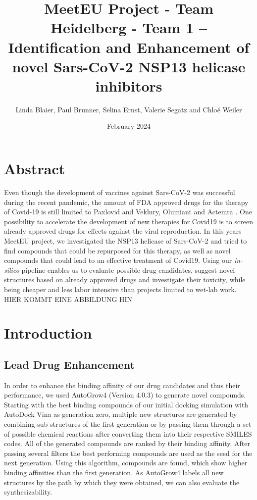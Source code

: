 \documentclass[11pt, letterpaper, titlepage]{article}
\title{MeetEU Project - Team Heidelberg - Team 1 -- \\ Identification and Enhancement of novel Sars-CoV-2 NSP13 helicase inhibitors}
\author{Linda Blaier, Paul Brunner, Selina Ernst, Valerie Segatz and Chlo\'{e} Weiler}
\date{February 2024}
\begin{document}
\maketitle

\ihead{\headmark}
\cfoot{\pagemark}   %

\section{Abstract}
Even though the development of vaccines against Sars-CoV-2 was successful during the recent pandemic, the amount of FDA approved drugs for the therapy of Covid-19 is still limited to Paxlovid and Veklury, Olumiant and Actemra \cite{FDA_COVID}. One possibility to accelerate the development of new therapies for Covid19 is to screen already approved drugs for effects against the viral reproduction. In this years MeetEU project, we investigated the NSP13 helicase of Sars-CoV-2 and tried to find compounds that could be repurposed for this therapy, as well as novel compounds that could lead to an effective treatment of Covid19. Using our \textit{in-silico} pipeline enables us to evaluate possible drug candidates, suggest novel structures based on already approved drugs and investigate their toxicity, while being cheaper and less labor intensive than projects limited to wet-lab work. 
HIER KOMMT EINE ABBILDUNG HIN

\FloatBarrier


\section{Introduction}
\subsection{Lead Drug Enhancement}
In order to enhance the binding affinity of our drug candidates and thus their performance, we used AutoGrow4 (Version 4.0.3) \cite{package_Autogrow4} to generate novel compounds. Starting with the best binding compounds of our initial docking simulation with AutoDock Vina as generation zero, multiple new structures are generated by combining sub-structures of the first generation or by passing them through a set of possible chemical reactions after converting them into their respective SMILES codes. All of the generated compounds are ranked by their binding affinity. After passing several filters the best performing compounds are used as the seed for the next generation. Using this algorithm, compounds are found, which show higher binding affinities than the first generation. As AutoGrow4 labels all new structures by the path by which they were obtained, we can also evaluate the synthesizability.  
\end{document}
